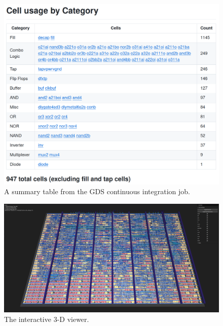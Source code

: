 \begin{figure}[!t]
\centering
\includegraphics[width=\columnwidth]{./Figs/gh action cell stats.png}
\caption{A summary table from the GDS continuous integration job.}
\label{fig:summary_table_GDS_job}
\end{figure}

\begin{figure}[!t]
\centering
\includegraphics[width=\columnwidth]{./Figs/gh action gds 3d view.png}
\caption{The interactive 3-D viewer.}
\label{fig:interactive_3D_viewer}
\end{figure}

